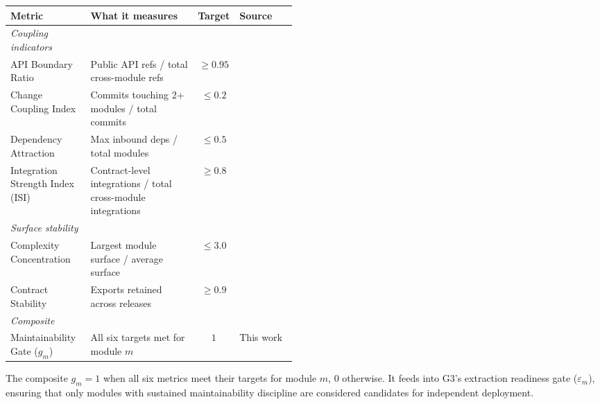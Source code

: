 \medskip
\noindent
\small
\begin{tabularx}{\linewidth}{p{0.28\linewidth} X c p{0.20\linewidth}}
\toprule
\textbf{Metric} & \textbf{What it measures} & \textbf{Target} & \textbf{Source} \\
\midrule
\emph{Coupling indicators} & & & \\
API Boundary Ratio & Public API refs / total cross-module refs & $\geq 0.95$ & \cite{parnas1972informationhiding} \\
Change Coupling Index & Commits touching 2+ modules / total commits & $\leq 0.2$ & \cite{FordParsons2017} \\
Dependency Attraction & Max inbound deps / total modules & $\leq 0.5$ & \cite{yourdon1979structured} \\
Integration Strength Index (ISI) & Contract-level integrations / total cross-module integrations & $\geq 0.8$ & \cite{khononov2024balancing} \\
\midrule
\emph{Surface stability} & & & \\
Complexity Concentration & Largest module surface / average surface & $\leq 3.0$ & \cite{martin2012clean} \\
Contract Stability & Exports retained across releases & $\geq 0.9$ & \cite{FordParsons2017,khononov2024balancing} \\
\midrule
\emph{Composite} & & & \\
Maintainability Gate ($g_m$) & All six targets met for module $m$ & $1$ & This work \\
\bottomrule
\end{tabularx}
\normalsize

\medskip
\noindent
The composite $g_m = 1$ when all six metrics meet their targets for module $m$, $0$ otherwise. It feeds into G3's extraction readiness gate ($\varepsilon_m$), ensuring that only modules with sustained maintainability discipline are considered candidates for independent deployment.

